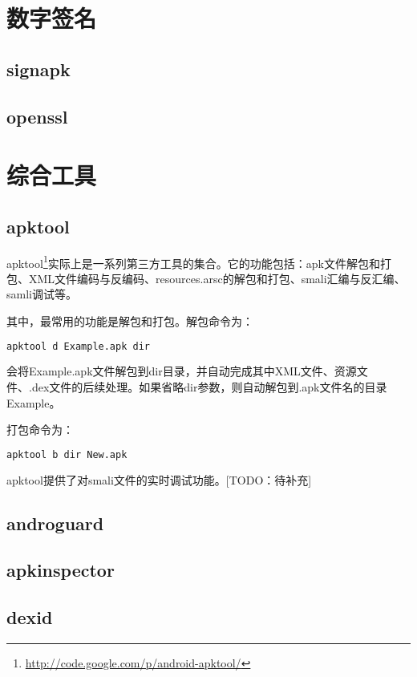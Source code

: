 \section{数字签名}
\subsection{signapk}
\subsection{openssl}

\section{综合工具}
\subsection{apktool}
apktool\footnote{\url{http://code.google.com/p/android-apktool/}}实际上是一系列第三方工具的集合。它的功能包括：apk文件解包和打包、XML文件编码与反编码、resources.arsc的解包和打包、smali汇编与反汇编、samli调试等。

其中，最常用的功能是解包和打包。解包命令为：
\begin{lstlisting}[language=bash, numbers=none]
apktool d Example.apk dir
\end{lstlisting}
会将Example.apk文件解包到dir目录，并自动完成其中XML文件、资源文件、.dex文件的后续处理。如果省略dir参数，则自动解包到.apk文件名的目录Example。

打包命令为：
\begin{lstlisting}[language=bash, numbers=none]
apktool b dir New.apk
\end{lstlisting}

apktool提供了对smali文件的实时调试功能。[TODO：待补充]
\subsection{androguard}
\subsection{apkinspector}
\subsection{dexid}
